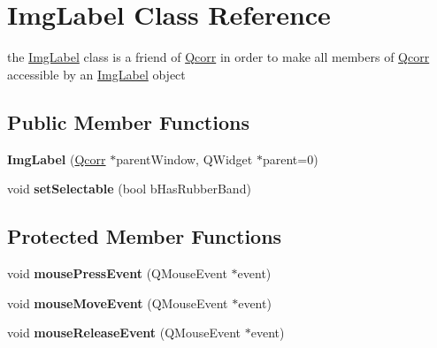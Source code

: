 \hypertarget{classImgLabel}{
\section{ImgLabel Class Reference}
\label{classImgLabel}
}
the \hyperlink{classImgLabel}{ImgLabel} class is a friend of \hyperlink{classQcorr}{Qcorr} in order to make all members of \hyperlink{classQcorr}{Qcorr} accessible by an \hyperlink{classImgLabel}{ImgLabel} object  


\subsection*{Public Member Functions}
\begin{CompactItemize}
\item 
\hypertarget{classImgLabel_69e37830ecfccbd824166d03fc9c248d}{
\textbf{ImgLabel} (\hyperlink{classQcorr}{Qcorr} $\ast$parentWindow, QWidget $\ast$parent=0)}
\label{classImgLabel_69e37830ecfccbd824166d03fc9c248d}

\item 
\hypertarget{classImgLabel_3e5988fc63515a300e69593c9236e126}{
void \textbf{setSelectable} (bool bHasRubberBand)}
\label{classImgLabel_3e5988fc63515a300e69593c9236e126}

\end{CompactItemize}
\subsection*{Protected Member Functions}
\begin{CompactItemize}
\item 
\hypertarget{classImgLabel_20d52d626aa1a1d6cebe3f7e2c33e295}{
void \textbf{mousePressEvent} (QMouseEvent $\ast$event)}
\label{classImgLabel_20d52d626aa1a1d6cebe3f7e2c33e295}

\item 
\hypertarget{classImgLabel_935514f1ec077f7c817fb057a16d8c4d}{
void \textbf{mouseMoveEvent} (QMouseEvent $\ast$event)}
\label{classImgLabel_935514f1ec077f7c817fb057a16d8c4d}

\item 
\hypertarget{classImgLabel_ccc9e0b19e5e7873a8493f0d7e03c65b}{
void \textbf{mouseReleaseEvent} (QMouseEvent $\ast$event)}
\label{classImgLabel_ccc9e0b19e5e7873a8493f0d7e03c65b}

\end{CompactItemize}
